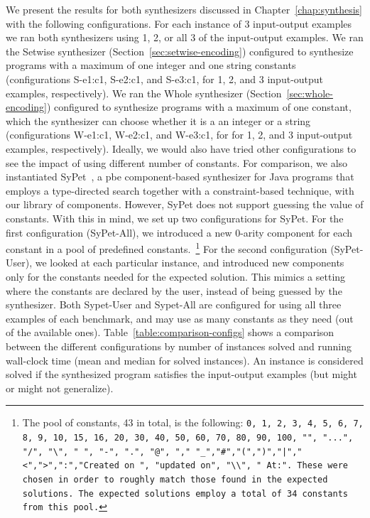 We present the results for both synthesizers discussed in
Chapter~\ref{chap:synthesis} with the following configurations.
For each instance of 3 input-output examples we ran both synthesizers using 1,
2, or all 3 of the input-output examples.
We ran the Setwise synthesizer (Section~\ref{sec:setwise-encoding}) configured
to synthesize programs with a maximum of one integer and one string constants
(configurations S-e1:c1, S-e2:c1, and S-e3:c1, for 1, 2, and 3 input-output
examples, respectively).
We ran the Whole synthesizer (Section~\ref{sec:whole-encoding}) configured to
synthesize programs with a maximum of one constant, which the synthesizer can
choose whether it is a an integer or a string (configurations W-e1:c1, W-e2:c1,
and W-e3:c1, for for 1, 2, and 3 input-output examples, respectively).
Ideally, we would also have tried other configurations to see the impact of
using different number of constants.
For comparison, we also instantiated SyPet~\cite{Feng:2017:CSC}, a
\gls{pbe} component-based synthesizer for Java programs that employs a
type-directed search together with a constraint-based technique, with our
library of components.
However, SyPet does not support guessing the value of constants.
With this in mind, we set up two configurations for SyPet.
For the first configuration (SyPet-All), we introduced a new 0-arity component
for each constant in a pool of predefined constants.~\footnote{The pool of
constants, 43 in total, is the following: \lstinline{0, 1, 2, 3, 4, 5, 6, 7, 8,
9, 10, 15, 16, 20, 30, 40, 50, 60, 70, 80, 90, 100, "", "...", "/", "\", " ",
"-", ".", "@", "," "_","#","(",")","|","<",">",":","Created on ", "updated on",
"\\", " At:". These were chosen in order to roughly match those found in the
expected solutions. The expected solutions employ a total of 34 constants from
this pool.}}
For the second configuration (SyPet-User), we looked at each particular
instance, and introduced new components only for the constants needed for the
expected solution.
This mimics a setting where the constants are declared by the user, instead of
being guessed by the synthesizer.
Both Sypet-User and Sypet-All are configured for using all three examples of
each benchmark, and may use as many constants as they need (out of the available
ones).
Table~\ref{table:comparison-configs} shows a comparison between the different
configurations by number of instances solved and running wall-clock time (mean
and median for solved instances).
An instance is considered solved if the synthesized program satisfies the
input-output examples (but might or might not generalize).

